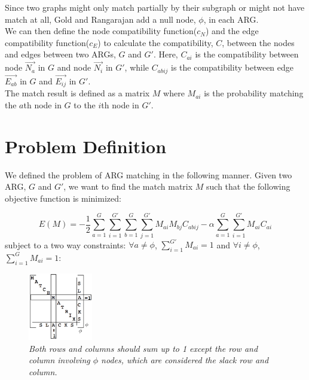 Since two graphs might only match partially by their subgraph or might not have match at all, Gold and Rangarajan add a null node, $\phi$, in each ARG.\\

We can then define the node compatibility function($c_N$) and the edge compatibility function($c_E$) to calculate the compatibility, $C$, between the nodes and edges between two ARGs, $G$ and $G'$. Here, $C_{ai}$ is the compatibility between node $\overrightarrow{N_{a}}$ in $G$ and node $\overrightarrow{N_{i}}$ in $G'$, while $C_{abij}$ is the compatibility between edge $\overrightarrow{E_{ab}}$ in $G$ and $\overrightarrow{E_{ij}}$ in $G'$.\\

The match result is defined as a matrix $M$ where $M_{ai}$ is the probability matching the $a$th node in $G$ to the $i$th node in $G'$.

\section{Problem Definition}

We defined the problem of ARG matching in the following manner. Given two ARG, $G$ and $G'$, we want to find the match matrix $M$ such that the following objective function is minimized:

\begin{equation}\label{eq:energy}
E(M)=-\frac{1}{2}\sum_{a=1}^{G}\sum_{i=1}^{G'}\sum_{b=1}^{G}\sum_{j=1}^{G'}M_{ai}M_{bj}C_{abij}-\alpha\sum_{a=1}^{G}\sum_{i=1}^{G'}M_{ai}C_{ai}
\end{equation}
subject to a two way constraints: $\forall a\ne\phi$, $\sum_{i=1}^{G'}M_{ai}=1$ and $\forall i\ne\phi$, $\sum_{i=1}^GM_{ai}=1$:

\begin{figure}[h]
	\centering
	\captionsetup{justification=centering}
	\includegraphics[width=0.25\textwidth]{figs/two_way_constraints.png}
	\caption[Caption for LOF]{\emph{Both rows and columns should sum up to 1 except the row and column involving $\phi$ nodes, which are considered the slack row and column.}}
	\label{fig:two_way_constraints}
\end{figure}

